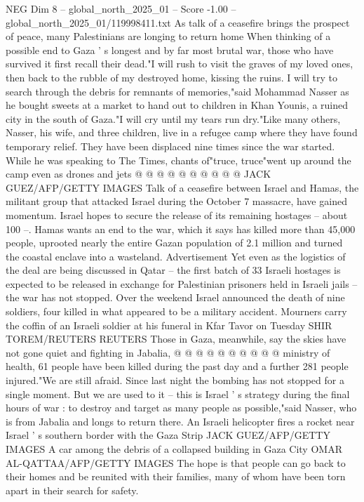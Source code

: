 \begin{textsample}{NEG Dim 8 – global\_north\_2025\_01 – Score -1.00 – global\_north\_2025\_01/119998411.txt}  \label{ex:f8_neg_341}
As talk of a ceasefire brings the prospect of peace, many Palestinians are longing to return home When thinking of a possible end to Gaza ' s longest and by far most brutal war, those who have survived it first recall their dead."I will rush to visit the graves of my loved ones, then back to the rubble of my destroyed home, kissing the ruins.
I will try to search through the debris for remnants of memories,"said Mohammad Nasser as he bought sweets at a market to hand out to children in Khan Younis, a ruined city in the south of Gaza."I will cry until my tears run dry."Like many others, Nasser, his wife, and three children, live in a refugee camp where they have found temporary relief.
They have been displaced nine times since the war started.
While he was speaking to The Times, chants of"truce, truce"went up around the camp even as drones and jets @ @ @ @ @ @ @ @ @ @ JACK GUEZ/AFP/GETTY IMAGES Talk of a ceasefire between Israel and Hamas, the militant group that attacked Israel during the October 7 massacre, have gained momentum.
Israel hopes to secure the release of its remaining hostages -- about 100 --.
Hamas wants an end to the war, which it says has killed more than 45,000 people, uprooted nearly the entire Gazan population of 2.1 million and turned the coastal enclave into a wasteland.
Advertisement Yet even as the logistics of the deal are being discussed in Qatar -- the first batch of 33 Israeli hostages is expected to be released in exchange for Palestinian prisoners held in Israeli jails -- the war has not stopped.
Over the weekend Israel announced the death of nine soldiers, four killed in what appeared to be a military accident.
Mourners carry the coffin of an Israeli soldier at his funeral in Kfar Tavor on Tuesday SHIR TOREM/REUTERS REUTERS Those in Gaza, meanwhile, say the skies have not gone quiet and fighting in Jabalia, @ @ @ @ @ @ @ @ @ @ ministry of health, 61 people have been killed during the past day and a further 281 people injured."We are still afraid.
Since last night the bombing has not stopped for a single moment.
But we are used to it -- this is Israel ' s strategy during the final hours of war : to destroy and target as many people as possible,"said Nasser, who is from Jabalia and longs to return there.
An Israeli helicopter fires a rocket near Israel ' s southern border with the Gaza Strip JACK GUEZ/AFP/GETTY IMAGES A car among the debris of a collapsed building in Gaza City OMAR AL-QATTAA/AFP/GETTY IMAGES The hope is that people can go back to their homes and be reunited with their families, many of whom have been torn apart in their search for safety.

\end{textsample}
